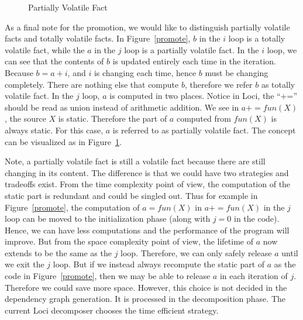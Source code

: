 \documentclass{article}
\begin{document}
\begin{figure}[htbp]
  \centerline{ \epsfxsize=2.75in }
 \caption{Partially Volatile Fact}
 \label{pvolatile}
\end{figure}

As a final note for the promotion, we would like to distinguish
partially volatile facts and totally volatile facts. In
Figure~\ref{promote}, $b$ in the $i$ loop is a totally volatile fact,
while the $a$ in the $j$ loop is a partially volatile fact. In the $i$
loop, we can see that the contents of $b$ is updated entirely each
time in the iteration. Because $b=a+i$, and $i$ is changing each time,
hence $b$ must be changing completely. There are nothing else that
compute $b$, therefore we refer $b$ as totally volatile fact. In the
$j$ loop, $a$ is computed in two places. Notice in Loci, the
``+='' should be read as union instead of arithmetic addition. We see in
$a+=fun(X)$, the source $X$ is static. Therefore the part of $a$
computed from $fun(X)$ is always static. For this case, $a$ is
referred to as partially volatile fact. The concept can be visualized
as in Figure~\ref{pvolatile}. 

Note, a partially volatile fact is still a volatile fact because there
are still changing in its content. The difference is that we could
have two strategies and tradeoffs exist. From the time complexity
point of view, the computation of the static part is redundant and
could be singled out. Thus for example in Figure~\ref{promote}, the
computation of $a=fun(X)$ in $a+=fun(X)$ in the $j$ loop can be moved
to the initialization phase (along with $j=0$ in the code). Hence, we
can have less computations and the performance of the program will
improve. But from the space complexity point of view, the lifetime of
$a$ now extends to be the same as the $j$ loop. Therefore, we can
only safely release $a$ until we exit the $j$ loop. But if we instead
always recompute the static part of $a$ as the code in
Figure~\ref{promote}, then we may be able to release $a$ in each
iteration of $j$. Therefore we could save more space. However, this
choice is not decided in the dependency graph generation. It is
processed in the decomposition phase. The current Loci decomposer
chooses the time efficient strategy. 
\end{document}
